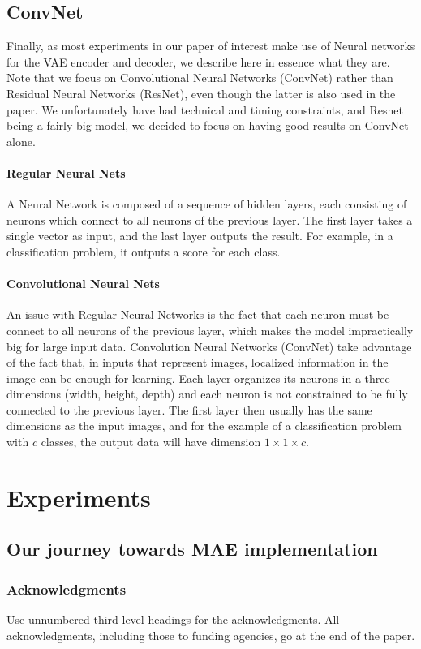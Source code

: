 \documentclass{article} %
\begin{document}
\subsection {ConvNet}
Finally, as most experiments in our paper of interest make use of Neural networks
for the VAE encoder and decoder, we describe here in essence what they are. Note
that we focus on Convolutional Neural Networks (ConvNet) rather than Residual
Neural Networks (ResNet), even though the latter is also used in the paper. We
unfortunately have had technical and timing constraints, and Resnet being
a fairly big model, we decided to focus on having good results on ConvNet alone.

\paragraph {Regular Neural Nets} A Neural Network is composed of a sequence of
hidden layers, each consisting of neurons which connect to all neurons of the
previous layer. The first layer takes a single vector as input, and the last
layer outputs the result. For example, in a classification problem, it outputs a
score for each class.

\paragraph {Convolutional Neural Nets}
An issue with Regular Neural Networks is the fact that each neuron must be
connect to all neurons of the previous layer, which makes the model
impractically big for large input data. Convolution Neural Networks (ConvNet)
take advantage of the fact that, in inputs that represent images, localized
information in the image can be enough for learning. Each layer organizes its
neurons in a three dimensions (width, height, depth) and each neuron is not
constrained to be fully connected to the previous layer. The first layer then
usually has the same dimensions as the input images, and for the example of a
classification problem with $c$ classes, the output data will have dimension
$1\times 1\times c$.

\section{Experiments}
\subsection{Our journey towards MAE implementation}


\subsubsection*{Acknowledgments}

Use unnumbered third level headings for the acknowledgments. All
acknowledgments, including those to funding agencies, go at the end of the paper.



\end{document}

